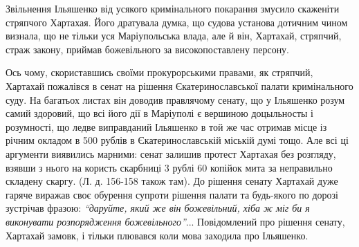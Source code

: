 \documentclass[a4paper,20pt]{report}
\begin{document}
Звільнення Ільяшенко від усякого кримінального покарання змусило
скаженіти стряпчого Хартахая. Його дратувала думка, що судова установа
дотичним чином визнала, що не тільки уся Маріупольська влада, але й він, Хартахай,
стряпчий, страж закону, приймав божевільного за високопоставлену персону.

Ось чому, скориставшись своїми прокурорськими правами, як стряпчий, Хартахай
пожалівся в сенат на рішення Єкатеринославської палати кримінального суду. На
багатьох листах він доводив правлячому сенату, що у Ільяшенко розум самий
здоровий, що всі його дії в Маріуполі є вершиною доцыльносты і розумності, що
ледве виправданий Ільяшенко в той же час отримав місце із річним окладом в 500
рублів в Єкатеринославській міській думі тощо. Але всі ці аргументи виявились
марними: сенат залишив протест Хартахая без розгляду, взявши з нього на користь
скарбниці 3 рублі 60 копійок мита за неправильно складену скаргу. (Л. д.
156-158 також там). До рішення сенату Хартахай дуже гаряче виражав своє
обурення супроти рішення палати та будь-якого по дорозі зустрічав фразою:
\emph{``даруйте, який же він божевільний, хіба ж міг би я виконувати
розпорядження божевільного''}... Повідомлений про рішення сенату, Хартахай замовк, і тільки
плювався коли мова заходила про Ільяшенко.
\end{document}
